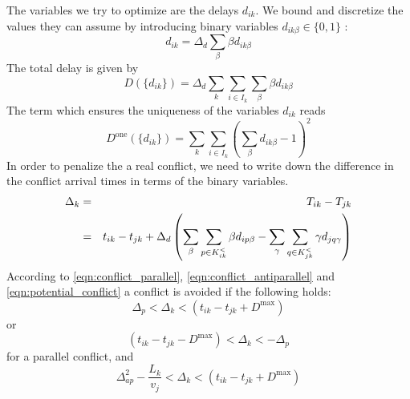 \documentclass{article}
\begin{document}
The variables we try to optimize are the delays $d_{ik}$.
We bound and discretize the values they can assume by introducing binary variables $d_{ik\beta}\in\{0, 1\}$ :
\begin{equation*}
    d_{ik} = \Delta_d \sum_\beta \beta d_{ik\beta}
\end{equation*}
The total delay is given by
\begin{equation} \label{eqn:idm_cost_delay}
    D(\{d_{ik}\}) = \Delta_d \sum_k \sum_{i \in I_k} \sum_\beta \beta d_{ik\beta}
\end{equation}
The term which ensures the uniqueness of the variables $d_{ik}$ reads
\begin{equation} \label{eqn:idm_cost_delay_unique}
    D^\text{one}(\{d_{ik}\})  =  \sum_k \sum_{i \in I_k} \left( \sum_\beta d_{ik\beta} - 1\right)^2
\end{equation}
In order to penalize the a real conflict, we need to write down the difference in the conflict arrival times in terms of the binary variables.
\begin{eqnarray}
    \Delta_k &=& T_{ik} - T_{jk} \notag \\
             &=& t_{ik} - t_{jk} + \Delta_d \left( \sum_\beta \sum_{p\in K^<_{ik}} \beta d_{ip\beta}  - \sum_\gamma \sum_{q\in K^<_{jk}} \gamma d_{jq\gamma} \right) \label{eqn:idm_delay_difference}
\end{eqnarray}
According to \eqref{eqn:conflict_parallel}, \eqref{eqn:conflict_antiparallel} and \eqref{eqn:potential_conflict} a conflict is avoided if the following holds:
\begin{equation*} \label{eqn:idm_slack_greater_parallel}
    \Delta_p < \Delta_k < (t_{ik} - t_{jk} + D^{\text{max}})
\end{equation*}
or
\begin{equation*} \label{eqn:idm_slack_lesser_parallel}
     (t_{ik} - t_{jk} - D^{\text{max}}) < \Delta_k < -\Delta_p
\end{equation*}
for a parallel conflict, and
\begin{equation*} \label{eqn:idm_slack_greater_antiparallel}
    \Delta^2_{ap} - \frac{L_k}{v_j} < \Delta_k < (t_{ik} - t_{jk} + D^{\text{max}})
\end{equation*}
\end{document}
